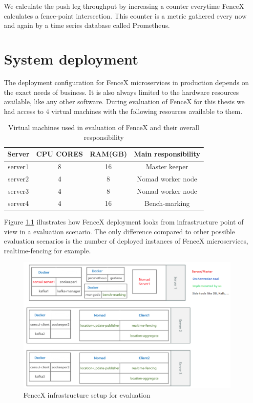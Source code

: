 \documentclass[a4]{report}
\begin{document}
    We calculate the push leg throughput by increasing a counter everytime FenceX calculates a fence-point intersection.
    This counter is a metric gathered every now and again by a time series database called Prometheus.


    \chapter{System deployment}
    The deployment configuration for FenceX microservices in production depends on the exact needs of business.
    It is also always limited to the hardware resources available, like any other software.
    During evaluation of FenceX for this thesis we had access to 4 virtual machines with the following resources
    available to them.

    \begin{table}[h!]
        \centering
        \begin{tabular}{|c|c|c|c|}
            \hline
            Server  & CPU CORES & RAM(GB) & Main responsibility \\
            \hline
            server1 & 8         & 16      & Master keeper       \\
            server2 & 4         & 8       & Nomad worker node   \\
            server3 & 4         & 8       & Nomad worker node   \\
            server4 & 4         & 16      & Bench-marking       \\
            \hline
        \end{tabular}
        \caption{Virtual machines used in evaluation of FenceX and their overall responsibility}
        \label{table:vms}
    \end{table}

    Figure \ref{fig:infrastructure} illustrates how FenceX deployment looks from infrastructure point of view in a
    evaluation scenario.
    The only difference compared to other possible evaluation scenarios is the number of deployed instances of FenceX
    microservices, realtime-fencing for example.

    \begin{figure}[h!]
        \centering
        \caption{FenceX infrastructure setup for evaluation}
        \label{fig:infrastructure}
        \includegraphics[scale=0.6]{images/Infrsutracture.png}
    \end{figure}
\end{document}
